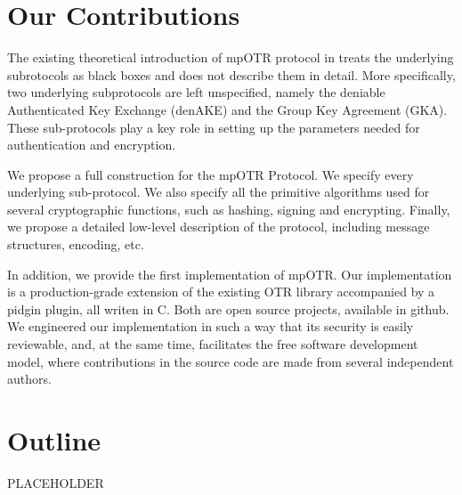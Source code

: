 \section{Our Contributions}
The existing theoretical introduction of mpOTR protocol in \cite{mpotr} treats the underlying subrotocols as black boxes and does not describe them in detail. More specifically, two underlying subprotocols are left unspecified, namely the deniable Authenticated Key Exchange (denAKE) and the Group Key Agreement (GKA). These sub-protocols play a key role in setting up the parameters needed for authentication and encryption.

We propose a full construction for the mpOTR Protocol. We specify every underlying sub-protocol. We also specify all the primitive algorithms used for several cryptographic functions, such as hashing, signing and encrypting. Finally, we propose a detailed low-level description of the protocol, including message structures, encoding, etc.

In addition, we provide the first implementation of mpOTR. Our implementation is a production-grade extension of the existing OTR library accompanied by a pidgin plugin, all writen in C. Both are open source projects, available in github. We engineered our implementation in such a way that its security is easily reviewable, and, at the same time, facilitates the free software development model, where contributions in the source code are made from several independent authors.

\section{Outline}
PLACEHOLDER
